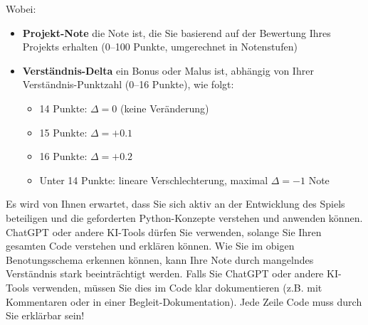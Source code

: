 Wobei:
\begin{itemize}
    \item \textbf{Projekt-Note} die Note ist, die Sie basierend auf der Bewertung Ihres Projekts erhalten (0--100 Punkte, umgerechnet in Notenstufen)
    \item \textbf{Verständnis-Delta} ein Bonus oder Malus ist, abhängig von Ihrer Verständnis-Punktzahl (0--16 Punkte), wie folgt:
    \begin{itemize}
        \item 14 Punkte: $\Delta = 0$ (keine Veränderung)
        \item 15 Punkte: $\Delta = +0.1$
        \item 16 Punkte: $\Delta = +0.2$
        \item Unter 14 Punkte: lineare Verschlechterung, maximal $\Delta = -1$ Note
    \end{itemize}
\end{itemize}

\begin{myattention}[KI-Tools]
    Es wird von Ihnen erwartet, dass Sie sich aktiv an der Entwicklung des Spiels beteiligen und die geforderten Python-Konzepte verstehen und anwenden können. ChatGPT oder andere KI-Tools dürfen Sie verwenden, solange Sie Ihren gesamten Code verstehen und erklären können. Wie Sie im obigen Benotungsschema erkennen können, kann Ihre Note durch mangelndes Verständnis stark beeinträchtigt werden. Falls Sie ChatGPT oder andere KI-Tools verwenden, müssen Sie dies im Code klar dokumentieren (z.B. mit Kommentaren oder in einer Begleit-Dokumentation). Jede Zeile Code muss durch Sie erklärbar sein!
\end{myattention}


